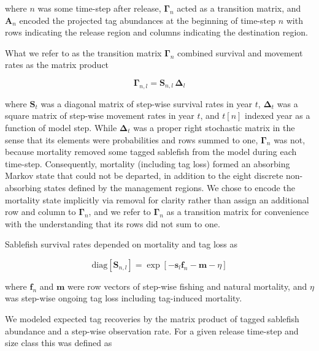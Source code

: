 \documentclass{article}
\begin{document}
\noindent where $n$ was some time-step after release, $\boldsymbol{\Gamma}_n$ acted as a transition matrix, and $\boldsymbol{A}_n$ encoded the projected tag abundances at the beginning of time-step $n$ with rows indicating the release region and columns indicating the destination region. 

What we refer to as the transition matrix $\boldsymbol{\Gamma}_n$ combined survival and movement rates as the matrix product

\begin{equation}
    \label{eq:transition}
    \boldsymbol{\Gamma}_{n,l} = \boldsymbol{S}_{n,l} \, \boldsymbol{\Delta}_{l}
\end{equation}

\noindent where $\boldsymbol{S}_t$ was a diagonal matrix of step-wise survival rates in year $t$, $\boldsymbol{\Delta}_t$ was a square matrix of step-wise movement rates in year $t$, and $t[n]$ indexed year as a function of model step. While $\boldsymbol{\Delta}_t$ was a proper right stochastic matrix in the sense that its elements were probabilities and rows summed to one, $\boldsymbol{\Gamma}_n$ was not, because mortality removed some tagged sablefish from the model during each time-step. Consequently, mortality (including tag loss) formed an absorbing Markov state that could not be departed, in addition to the eight discrete non-absorbing states defined by the management regions. We chose to encode the mortality state implicitly via removal for clarity rather than assign an additional row and column to $\boldsymbol{\Gamma}_n$, and we refer to $\boldsymbol{\Gamma}_n$ as a transition matrix for convenience with the understanding that its rows did not sum to one.

Sablefish survival rates depended on mortality and tag loss as

\begin{equation}
  \label{eq:survival}
  \mathrm{diag} \! \left[\boldsymbol{S}_{n,l}\right] = 
    \exp\!{\left[-\boldsymbol{s}_l \boldsymbol{f}_n - \boldsymbol{m} - \eta \right]}
\end{equation}

\noindent where $\boldsymbol{f}_n$ and $\boldsymbol{m}$ were row vectors of step-wise fishing and natural mortality, and $\eta$ was step-wise ongoing tag loss including tag-induced mortality. 

We modeled expected tag recoveries by the matrix product of tagged sablefish abundance and a step-wise observation rate. For a given release time-step and size class this was defined as
\end{document}
